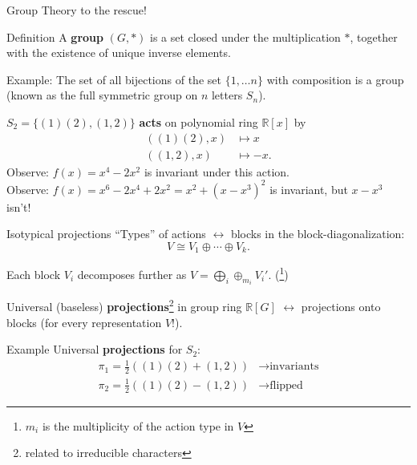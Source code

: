\begin{frame}{Group Theory to the rescue!}
  \begin{block}{Definition}
    A \textbf{group} $(G, *)$ is a set closed under the multiplication $*$, together with the existence of unique inverse elements.
  \end{block}
    {\small Example: The set of all bijections of the set $\{1,\ldots n\}$ with composition is a group (known as the full symmetric group on $n$ letters $S_n$).}
    
    $S_2 = \{(1)(2), (1,2)\}$ \textbf{acts} on polynomial ring $\mathbb{R}[x]$ by
    \begin{align*}
      ((1)(2), x) & \mapsto x\\
      ((1, 2), x) & \mapsto -x.
    \end{align*}
    {\small Observe: $f(x) = x^4 - 2x^2$ is invariant under this action.\\
    Observe: $f(x) = x^6 - 2x^4 + 2x^2 = x^2 + (x-x^3)^2$ is invariant, but $x-x^3$ isn't!}
    
\end{frame}


\begin{frame}{Isotypical projections}
    ``Types'' of actions $\leftrightarrow$  blocks in the block-diagonalization:
    \[V \cong V_1 \oplus \cdots \oplus V_k.\]
    
    Each block $V_i$ decomposes further as 
    $V = \bigoplus_i \oplus_{m_i} V_i'$. (\footnote{$m_i$ is the multiplicity of the action type in $V$})
    
    Universal (baseless) \textbf{projections}\footnote{related to irreducible characters} in group ring $\mathbb{R}[G]$ $\leftrightarrow$ projections onto blocks (for every representation $V$!).
%     
    \begin{block}{Example}
    \small
    Universal \textbf{projections} for $S_2$:\\[-0.2in]
    \begin{align*}
      \pi_1 = \frac{1}{2}((1)(2) + (1,2)) & \to\text{invariants}\\ 
      \pi_2 = \frac{1}{2}((1)(2) - (1,2)) & \to\text{flipped}
    \end{align*}
    \end{block}
    
\end{frame}

